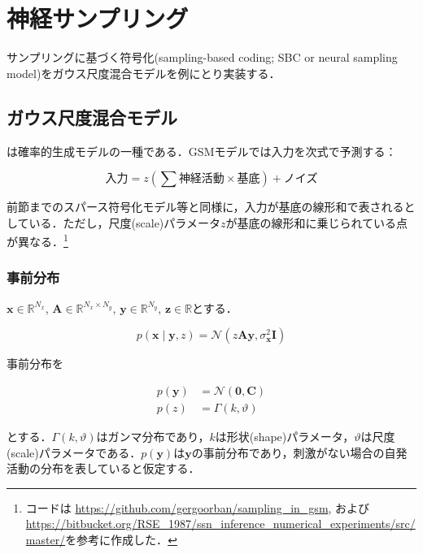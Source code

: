 \section{神経サンプリング}

サンプリングに基づく符号化(sampling-based coding; SBC or neural sampling model)をガウス尺度混合モデルを例にとり実装する．

\subsection{ガウス尺度混合モデル}
\textbf{}は確率的生成モデルの一種である\cite{Wainwright1999-cl}\cite{Orban2016-tm}．GSMモデルでは入力を次式で予測する：


\begin{equation}
\text{入力}={z}\left(\sum \text{神経活動} \times \text{基底} \right) + \text{ノイズ}
\end{equation}


前節までのスパース符号化モデル等と同様に，入力が基底の線形和で表されるとしている．ただし，尺度(scale)パラメータ$z$が基底の線形和に乗じられている点が異なる．\footnote{コードは\cite{Orban2016-tm} \url{https://github.com/gergoorban/sampling_in_gsm}, および\cite{Echeveste2020-sh} \url{https://bitbucket.org/RSE_1987/ssn_inference_numerical_experiments/src/master/}を参考に作成した．}


\subsubsection{事前分布}
$\mathbf{x} \in \mathbb{R}^{N_x}$, $\mathbf{A} \in \mathbb{R}^{N_x\times N_y}$, $\mathbf{y} \in \mathbb{R}^{N_y}$, $\mathbf{z} \in \mathbb{R}$とする．


\begin{equation}
p\left(\mathbf{x}\mid\mathbf{y}, z\right)=\mathcal{N}\left(z \mathbf{A} \mathbf{y}, \sigma_{\mathbf{x}}^{2} \mathbf{I}\right)
\end{equation}


事前分布を


\begin{align}
p\left(\mathbf{y}\right)&=\mathcal{N}\left(\mathbf{0}, \mathbf{C}\right)\\
p\left(z\right)&=\Gamma (k, \vartheta)
\end{align}


とする．$\Gamma(k, \vartheta)$はガンマ分布であり，$k$は形状(shape)パラメータ，$\vartheta$は尺度(scale)パラメータである．$p\left(\mathbf{y}\right)$は$\mathbf{y}$の事前分布であり，刺激がない場合の自発活動の分布を表していると仮定する．

